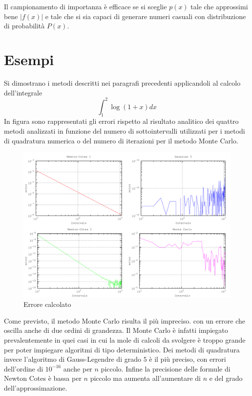 Il campionamento di importanza è efficace se si sceglie $p(x)$ tale che approssimi bene $|f(x)|$ e tale che si sia capaci di generare numeri casuali con distribuzione di probabilità $P(x)$.

\section{Esempi}
Si dimostrano i metodi descritti nei paragrafi precedenti applicandoli al calcolo dell'integrale $$\int_1^2\log(1+x)dx$$
In figura sono rappresentati gli errori rispetto al risultato analitico dei quattro metodi analizzati in funzione del numero di sottointervalli utilizzati per i metodi di quadratura numerica o del numero di iterazioni per il metodo Monte Carlo.
\begin{figure}[h!]
\centering
\includegraphics[width=\textwidth]{integral}
\caption{Errore calcolato}
\label{fig:integral}
\end{figure}

Come previsto, il metodo Monte Carlo risulta il più impreciso. con un errore che oscilla anche di due ordini di grandezza. Il Monte Carlo è infatti impiegato prevalentemente in quei casi in cui la mole di calcoli da svolgere è troppo grande per poter impiegare algoritmi di tipo deterministico.
Dei metodi di quadratura invece l'algoritmo di Gauss-Legendre di grado $5$ è il più preciso, con errori dell'ordine di $10^{-16}$ anche per $n$ piccolo. Infine la precisione delle formule di Newton Cotes è bassa per $n$ piccolo ma aumenta all'aumentare di $n$ e del grado dell'approssimazione.

